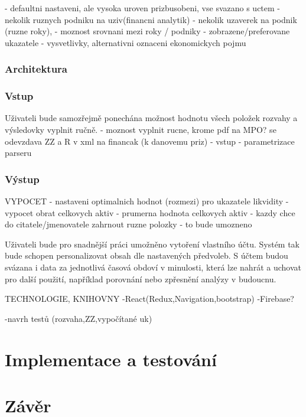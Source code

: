 - defaultni nastaveni, ale vysoka uroven prizbusobeni, vse svazano s uctem
- nekolik ruznych podniku na uziv(financni analytik)
- nekolik uzaverek na podnik (ruzne roky),
- moznost srovnani mezi roky / podniky
- zobrazene/preferovane ukazatele
- vysvetlivky, alternativni oznaceni ekonomickych pojmu


\subsection{Architektura}
 
\subsection{Vstup}

Uživateli bude samozřejmě ponechána možnost hodnotu všech položek rozvahy a výsledovky vyplnit ručně. 
- moznost vyplnit rucne, krome pdf na MPO? se odevzdava ZZ a R v xml na financak (k danovemu priz)
- vstup - parametrizace parseru

\subsection{Výstup}


VYPOCET
- nastaveni optimalnich hodnot (rozmezi) pro ukazatele likvidity
- vypocet obrat celkovych aktiv - prumerna hodnota celkovych aktiv
- kazdy chce do citatele/jmenovatele zahrnout ruzne polozky - to bude umozneno


Uživateli bude pro snadnější práci umožněno vytoření vlastního účtu. Systém tak bude schopen personalizovat obsah dle nastavených předvoleb. S účtem budou svázana i data za jednotlivá časová obdoví v minulosti, která lze nahrát a uchovat pro další použití, například porovnání nebo zpřesnění analýzy v budoucnu.

TECHNOLOGIE, KNIHOVNY
-React(Redux,Navigation,bootstrap)
-Firebase?

-navrh testů (rozvaha,ZZ,vypočítané uk)

\chapter{Implementace a testování}
\chapter{Závěr}
